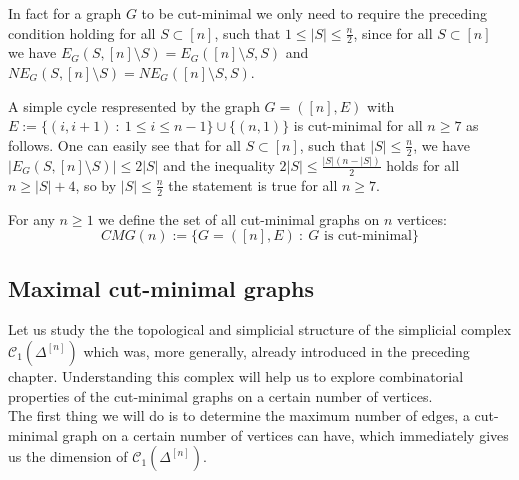 \begin{rem}\label{remark1}
In fact for a graph \(G\) to be cut-minimal we only need to require the preceding condition holding for all \(S\subset [n]\), such that \(1\leq|S|\leq\frac{n}{2}\), since for all \(S\subset [n]\) we have \(E_G(S,[n]\setminus S)=E_G([n]\setminus S,S)\) and \(NE_G(S,[n]\setminus S)=NE_G([n]\setminus S,S)\).
\end{rem}

\begin{expl}
A simple cycle respresented by the graph \(G=([n],E)\) with\\
\(E:=\{(i,i+1)\: :\: 1\leq i\leq n-1\}\cup\{(n,1)\}\) is cut-minimal for all \(n\geq 7\) as follows. One can easily see that for all \(S\subset [n]\), such that \(|S|\leq\frac{n}{2}\), we have \(|E_G(S,[n]\setminus S)|\leq 2|S|\) and the inequality \(2|S|\leq\frac{|S|(n-|S|)}{2}\) holds for all \(n\geq |S|+4\), so by \(|S|\leq\frac{n}{2}\) the statement is true for all \(n\geq 7\).
\end{expl}

\begin{defi}
For any \(n\geq 1\) we define the set of all cut-minimal graphs on \(n\) vertices:
\[
CMG(n):=\{G=([n],E)\: :\: G\text{ is cut-minimal}\}
\]
\end{defi}

\subsection{Maximal cut-minimal graphs}

Let us study the the topological and simplicial structure of the simplicial complex \(\mathcal{C}_1(\Delta^{[n]})\) which was, more generally, already introduced in the preceding chapter. Understanding this complex will help us to explore combinatorial properties of the cut-minimal graphs on a certain number of vertices.\\
The first thing we will do is to determine the maximum number of edges, a cut-minimal graph on a certain number of vertices can have, which immediately gives us the dimension of \(\mathcal{C}_1(\Delta^{[n]})\).

